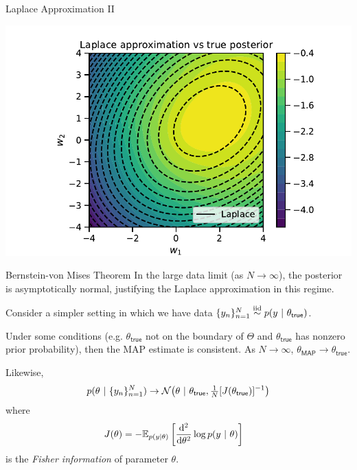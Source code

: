 \documentclass[aspectratio=169]{beamer}
\begin{document}
\begin{frame}{Laplace Approximation II}
    
    \centering
    \includegraphics[width=.75\textwidth]{figures/lap2/laplace.pdf}
\end{frame}


\begin{frame}{Bernstein-von Mises Theorem}
    In the large data limit (as $N \to \infty$), the posterior is asymptotically normal, justifying the Laplace approximation in this regime.
    
    Consider a simpler setting in which we have data $\{y_n\}_{n=1}^N \stackrel{\text{iid}}{\sim} p(y ~\vert~ \theta_{\mathsf{true}})$.
    
    Under some conditions (e.g. $\theta_{\mathsf{true}}$ not on the boundary of $\Theta$ and $\theta_{\mathsf{true}}$ has nonzero prior probability), then the MAP estimate is consistent. As $N \to \infty$,  $\theta_{\mathsf{MAP}} \to \theta_{\mathsf{true}}$.
    
    Likewise,
    \begin{align} 
        p(\theta ~\vert~ \{y_n\}_{n=1}^N) \to \mathcal{N} \big(\theta ~\vert~ \theta_{\mathsf{true}}, \tfrac{1}{N} [J(\theta_{\mathsf{true}})]^{-1} \big)
    \end{align}
    where 
    \begin{align}
        J(\theta) &= -\mathbb{E}_{p(y | \theta)} \left[ \frac{\mathop{}\!\mathrm{d}^2}{\mathop{}\!\mathrm{d} \theta^2} \log p(y ~\vert~ \theta) \right]
    \end{align}
    is the \emph{Fisher information} of parameter $\theta$.
\end{frame}
\end{document}

